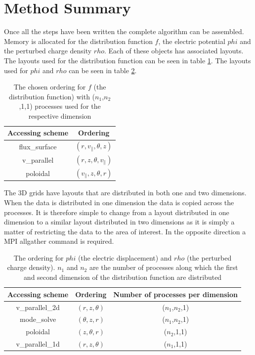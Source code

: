 
\section{Method Summary}

Once all the steps have been written the complete algorithm can be assembled. Memory is allocated for the distribution function $f$, the electric potential $phi$ and the perturbed charge density $rho$. Each of these objects has associated layouts. The layouts used for the distribution function can be seen in table \ref{tab::Ordering f}. The layouts used for $phi$ and $rho$ can be seen in table \ref{tab::Ordering phi}.

\begin{table}[ht]
\centering
 \begin{tabular}{|c|c|}
  \hline
  Accessing scheme & Ordering\\
  \hline
  flux\_surface & $(r,v_\parallel,\theta,z)$\\
  \hline
  v\_parallel & $(r,z,\theta,v_\parallel)$\\
  \hline
  poloidal & $(v_\parallel,z,\theta,r)$\\
  \hline
 \end{tabular}
 \caption{\label{tab::Ordering f} The chosen ordering for $f$ (the distribution function) with ($n_1$,$n_2$,1,1) processes used for the respective dimension}
\end{table}

The 3D grids have layouts that are distributed in both one and two dimensions. When the data is distributed in one dimension the data is copied across the processes. It is therefore simple to change from a layout distributed in one dimension to a similar layout distributed in two dimensions as it is simply a matter of restricting the data to the area of interest. In the opposite direction a MPI allgather command is required.

\begin{table}[ht]
\centering
 \begin{tabular}{|c|c|c|}
  \hline
  Accessing scheme & Ordering & Number of processes per dimension\\
  \hline
  v\_parallel\_2d & $(r,z,\theta)$ & ($n_1$,$n_2$,1)\\
  \hline
  mode\_solve & $(\theta,z,r)$ & ($n_1$,$n_2$,1)\\
  \hline
  poloidal & $(z,\theta,r)$ & ($n_2$,1,1)\\
  \hline
  v\_parallel\_1d & $(r,z,\theta)$ & ($n_1$,1,1)\\
  \hline
 \end{tabular}
 \caption{\label{tab::Ordering phi} The ordering for $phi$ (the electric displacement) and $rho$ (the perturbed charge density). $n_1$ and $n_2$ are the number of processes along which the first and second dimension of the distribution function are distributed}
\end{table}

